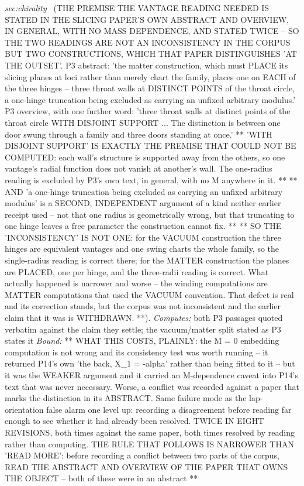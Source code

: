 \begin{description}
\textit{sec:chirality} \ (THE PREMISE THE VANTAGE READING NEEDED IS STATED IN THE SLICING PAPER'S OWN ABSTRACT AND OVERVIEW, IN GENERAL, WITH NO MASS DEPENDENCE, AND STATED TWICE -- SO THE TWO READINGS ARE NOT AN INCONSISTENCY IN THE CORPUS BUT TWO CONSTRUCTIONS, WHICH THAT PAPER DISTINGUISHES 'AT THE OUTSET'. P3 abstract: 'the matter construction, which must PLACE its slicing planes at loci rather than merely chart the family, places one on EACH of the three hinges -- three throat walls at DISTINCT POINTS of the throat circle, a one-hinge truncation being excluded as carrying an unfixed arbitrary modulus.' P3 overview, with one further word: 'three throat walls at distinct points of the throat circle WITH DISJOINT SUPPORT ... The distinction is between one door swung through a family and three doors standing at once.' ** 'WITH DISJOINT SUPPORT' IS EXACTLY THE PREMISE THAT COULD NOT BE COMPUTED: each wall's structure is supported away from the others, so one vantage's radial function does not vanish at another's wall. The one-radius reading is excluded by P3's own text, in general, with no M anywhere in it. ** ** AND 'a one-hinge truncation being excluded as carrying an unfixed arbitrary modulus' is a SECOND, INDEPENDENT argument of a kind neither earlier receipt used -- not that one radius is geometrically wrong, but that truncating to one hinge leaves a free parameter the construction cannot fix. ** ** SO THE 'INCONSISTENCY' IS NOT ONE: for the VACUUM construction the three hinges are equivalent vantages and one swing charts the whole family, so the single-radius reading is correct there; for the MATTER construction the planes are PLACED, one per hinge, and the three-radii reading is correct. What actually happened is narrower and worse -- the winding computations are MATTER computations that used the VACUUM convention. That defect is real and its correction stands, but the corpus was not inconsistent and the earlier claim that it was is WITHDRAWN. **). 
\emph{Computes:} both P3 passages quoted verbatim against the claim they settle; the vacuum/matter split stated as P3 states it
 \emph{Bound:} ** WHAT THIS COSTS, PLAINLY: the M = 0 embedding computation is not wrong and its consistency test was worth running -- it returned P14's own 'the back, X\_1 = -alpha' rather than being fitted to it -- but it was the WEAKER argument and it carried an M-dependence caveat into P14's text that was never necessary. Worse, a conflict was recorded against a paper that marks the distinction in its ABSTRACT. Same failure mode as the lap-orientation false alarm one level up: recording a disagreement before reading far enough to see whether it had already been resolved. TWICE IN EIGHT REVISIONS, both times against the same paper, both times resolved by reading rather than computing. THE RULE THAT FOLLOWS IS NARROWER THAN 'READ MORE': before recording a conflict between two parts of the corpus, READ THE ABSTRACT AND OVERVIEW OF THE PAPER THAT OWNS THE OBJECT -- both of these were in an abstract **

\end{description}
